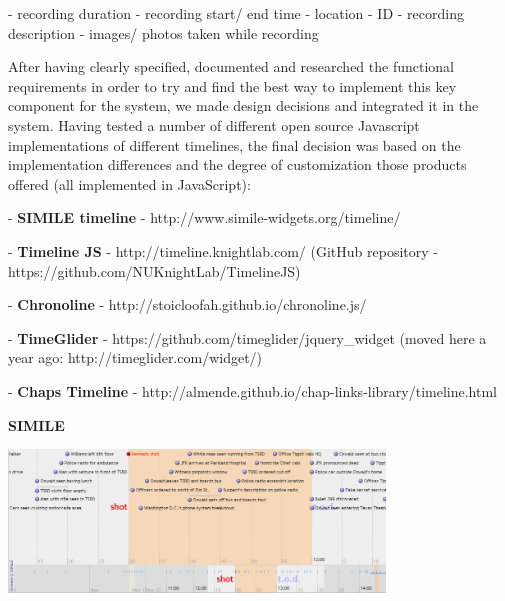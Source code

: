 \documentclass{l3proj}
\begin{document}
- recording duration
- recording start/ end time
- location
- ID
- recording description
- images/ photos taken while recording

After having clearly specified, documented and researched the functional requirements in order to try and find the best way to implement this key component for the system, we made design decisions and integrated it in the system. Having tested a number of different open source Javascript implementations of different timelines, the final decision was based on the implementation differences and the degree of customization those products offered (all implemented in JavaScript):


- \textbf{SIMILE timeline} - http://www.simile-widgets.org/timeline/

- \textbf{Timeline JS} - http://timeline.knightlab.com/ (GitHub repository - https://github.com/NUKnightLab/TimelineJS)

- \textbf{Chronoline} - http://stoicloofah.github.io/chronoline.js/

- \textbf{TimeGlider} - https://github.com/timeglider/jquery_widget (moved here a year ago: http://timeglider.com/widget/)

- \textbf{Chaps Timeline} - http://almende.github.io/chap-links-library/timeline.html



\textbf{SIMILE}

\includegraphics[width=0.75\textwidth]{images/SIMILE.png}
\end{document}
